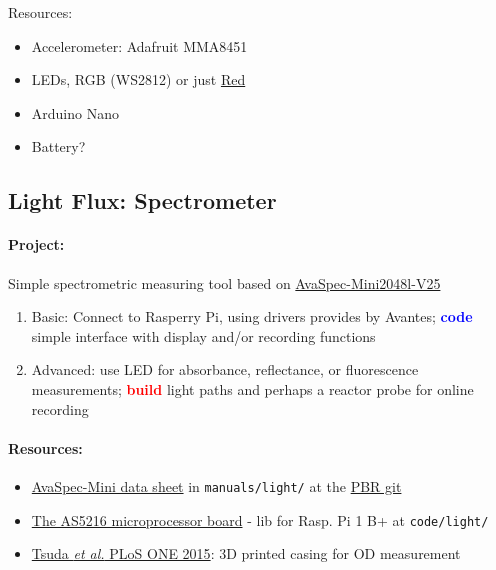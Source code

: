 \documentclass[12pt,a4paper]{scrartcl}
\newcommand{\git}[0]{\href{https://github.com/raim/PBR}{PBR git}}
\newcommand{\build}[0]{\textcolor{red}{\textbf{build}}}
\newcommand{\code}[0]{\textcolor{blue}{\textbf{code}}}
\begin{document}
Resources:
\begin{itemize}
\item Accelerometer: Adafruit MMA8451
\item LEDs, RGB (WS2812) or just \href{http://www.produktinfo.conrad.com/datenblaetter/175000-199999/180105-da-01-en-LED_0805_TYP_KP_2012SRC_PRV.pdf}{Red}
\item Arduino Nano
\item Battery?
\end{itemize}


\clearpage
\subsection{Light Flux: Spectrometer} 
\label{spec}
\paragraph{Project:} 
Simple spectrometric measuring tool based on
\href{http://www.avantes.com/products/spectrometers/compactline/item/723-avaspec-mini}{AvaSpec-Mini2048l-V25}

\begin{enumerate}
\item Basic: Connect to Rasperry Pi, using drivers provides by
  Avantes; \code{} simple interface with display and/or recording
  functions
\item Advanced: use LED for absorbance, reflectance, or fluorescence
  measurements; \build{} light paths and perhaps a reactor probe for
  online recording
\end{enumerate}


\paragraph{Resources:}
\begin{itemize}
\item
  \href{http://www.avantes.com/images/productsheets/AvaSpec_Mini5.pdf}{AvaSpec-Mini
    data sheet} in \texttt{manuals/light/} at the \git{}
\item \href{http://www.avantes.com/products/oem/item/220-oem-spectrometers-as5216-microprocessor-board}{The AS5216 microprocessor board} - lib for Rasp. Pi 1 B+ at \texttt{code/light/}
\item \href{http://www.ncbi.nlm.nih.gov/pmc/articles/PMC4641590/}{Tsuda
    \textit{et al.} PLoS ONE 2015}: 3D printed casing for OD measurement
\end{itemize}
\end{document}
